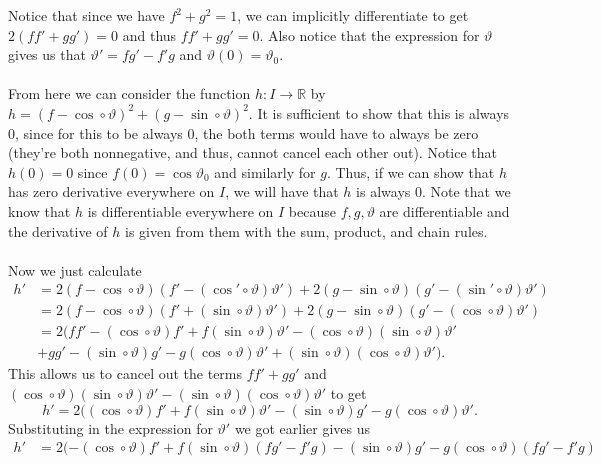 \documentclass[12 pt, letterpaper]{hmcpset}
\begin{document}
\begin{solution}
	Notice that since we have $f^2 + g^2 = 1$, we can implicitly differentiate to get $2 (f f' + g g') = 0$ and thus $f f' + g g' = 0$. Also notice that the expression for $\vartheta$ gives us that $\vartheta' = f g' - f' g$ and $\vartheta(0) = \vartheta_0$. \\\\
	From here we can consider the function $h : I \to \mathbb{R}$ by $h = (f - \cos \circ \vartheta)^2 + (g - \sin \circ \vartheta)^2$. It is sufficient to show that this is always $0$, since for this to be always $0$, the both terms would have to always be zero (they're both nonnegative, and thus, cannot cancel each other out). Notice that $h(0) = 0$ since $f(0) = \cos \vartheta_0$ and similarly for $g$. Thus, if we can show that $h$ has zero derivative everywhere on $I$, we will have that $h$ is always $0$. Note that we know that $h$ is differentiable everywhere on $I$ because $f, g, \vartheta$ are differentiable and the derivative of $h$ is given from them with the sum, product, and chain rules. \\\\
	Now we just calculate
	\[
		\begin{split}
			h' & = 2 (f - \cos \circ \vartheta)(f' - (\cos' \circ \vartheta) \vartheta') + 2(g - \sin \circ \vartheta)(g' - (\sin' \circ \vartheta) \vartheta') \\
			   & = 2 (f - \cos \circ \vartheta)(f' + (\sin \circ \vartheta) \vartheta') + 2(g - \sin \circ \vartheta)(g' - (\cos \circ \vartheta) \vartheta') \\
			   & = 2 (f f' - (\cos \circ \vartheta) f' + f (\sin \circ \vartheta) \vartheta' - (\cos \circ \vartheta) (\sin \circ \vartheta) \vartheta' \\ 
			   & + g g' - (\sin \circ \vartheta) g' - g (\cos \circ \vartheta) \vartheta' + (\sin \circ \vartheta) (\cos \circ \vartheta) \vartheta').
		\end{split}
	\]
	This allows us to cancel out the terms $f f' + g g'$ and $(\cos \circ \vartheta) (\sin \circ \vartheta) \vartheta' - (\sin \circ \vartheta) (\cos \circ \vartheta) \vartheta'$ to get
	\[
		h' = 2 ((\cos \circ \vartheta) f' + f (\sin \circ \vartheta) \vartheta' - (\sin \circ \vartheta) g' - g (\cos \circ \vartheta) \vartheta'.
	\]
	Substituting in the expression for $\vartheta'$ we got earlier gives us
	\[
		\begin{split}
			h' & = 2 (-(\cos \circ \vartheta) f' + f (\sin \circ \vartheta) (f g' - f' g) - (\sin \circ \vartheta) g' - g (\cos \circ \vartheta) (f g' - f' g) \\

\end{split}\]
\end{solution}
\end{document}
